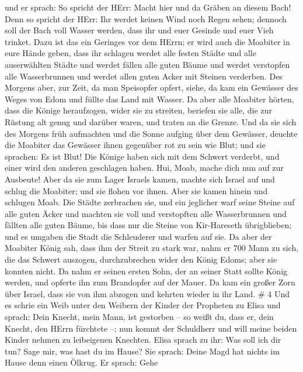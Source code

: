  und er sprach: So spricht der HErr: Macht hier und da
Gräben an diesem Bach!  Denn so spricht der HErr: Ihr
werdet keinen Wind noch Regen sehen; dennoch soll der Bach voll Wasser
werden, dass ihr und euer Gesinde und euer Vieh trinket. 
Dazu ist das ein Geringes vor dem HErrn; er wird auch die Moabiter in
eure Hände geben,  dass ihr schlagen werdet alle festen
Städte und alle auserwählten Städte und werdet fällen alle guten Bäume
und werdet verstopfen alle Wasserbrunnen und werdet allen guten Acker
mit Steinen verderben.  Des Morgens aber, zur Zeit, da man
Speisopfer opfert, siehe, da kam ein Gewässer des Weges von Edom und
füllte das Land mit Wasser.  Da aber alle Moabiter hörten,
dass die Könige heraufzogen, wider sie zu streiten, beriefen sie alle,
die zur Rüstung alt genug und darüber waren, und traten an die Grenze.
 Und da sie sich des Morgens früh aufmachten und die Sonne
aufging über dem Gewässer, deuchte die Moabiter das Gewässer ihnen
gegenüber rot zu sein wie Blut;  und sie sprachen: Es ist
Blut! Die Könige haben sich mit dem Schwert verderbt, und einer wird den
anderen geschlagen haben. Hui, Moab, mache dich nun auf zur Ausbeute!
 Aber da sie zum Lager Israels kamen, machte sich Israel
auf und schlug die Moabiter; und sie flohen vor ihnen. Aber sie kamen
hinein und schlugen Moab.  Die Städte zerbrachen sie, und
ein jeglicher warf seine Steine auf alle guten Äcker und machten sie
voll und verstopften alle Wasserbrunnen und fällten alle guten Bäume,
bis dass nur die Steine von Kir-Hareseth übrigblieben; und es umgaben
die Stadt die Schleuderer und warfen auf sie.  Da aber der
Moabiter König sah, dass ihm der Streit zu stark war, nahm er 700 Mann
zu sich, die das Schwert auszogen, durchzubrechen wider den König Edoms;
aber sie konnten nicht.  Da nahm er seinen ersten Sohn, der
an seiner Statt sollte König werden, und opferte ihn zum Brandopfer auf
der Mauer. Da kam ein großer Zorn über Israel, dass sie von ihm abzogen
und kehrten wieder in ihr Land. \# 4  Und es schrie ein Weib
unter den Weibern der Kinder der Propheten zu Elisa und sprach: Dein
Knecht, mein Mann, ist gestorben -- so weißt du, dass er, dein Knecht,
den HErrn fürchtete --; nun kommt der Schuldherr und will meine beiden
Kinder nehmen zu leibeigenen Knechten.  Elisa sprach zu ihr:
Was soll ich dir tun? Sage mir, was hast du im Hause? Sie sprach: Deine
Magd hat nichts im Hause denn einen Ölkrug.  Er sprach: Gehe
